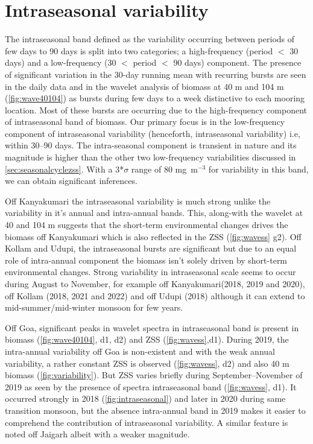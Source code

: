 \documentclass{article}
\begin{document}
	\section{Intraseasonal variability}
	\label{sec:intsnvar}
	The intraseasonal band defined as the variability occurring between periods of few days to 90 days is split into two categories; a high-frequency (period $<$ 30 days) and a low-frequency (30 $<$ period $<$ 90 days) component. The presence of significant variation in the 30-day running mean with recurring bursts are seen in the daily data and in the  wavelet analysis of biomass at 40 m and 104 m (\cref{fig:wave40104}) as bursts during few days to a week distinctive to each mooring location. Most of these bursts are occurring due to the high-frequency component of intraseasonal band of biomass. Our primary focus is in the low-frequency component of intraseasonal variability (henceforth, intraseasonal variability) i.e, within 30--90 days. The intra-seasonal component is transient in nature and its magnitude is higher than the other two low-frequency variabilities discussed in \autoref{sec:seasonalcyclezss}. With a 3*$\sigma$ range of 80 mg~m$^{-3}$ for variability in this band, we can obtain significant inferences. 
	
	Off Kanyakumari the intraseasonal variability is much strong unlike the variability in it's annual and intra-annual bands. This, along-with the wavelet at 40 and 104 m suggests that the short-term environmental changes drives the biomass off Kanyakumari which is also reflected in the ZSS (\cref{fig:wavess} g2). Off Kollam and Udupi, the intraseasonal bursts are significant but due to an equal role of intra-annual component the biomass isn't solely driven by short-term environmental changes. Strong variability in intraseasonal scale seems to occur during August to November, for example off Kanyakumari(2018, 2019 and 2020), off Kollam (2018, 2021 and 2022) and off Udupi (2018) although it can extend to mid-summer/mid-winter monsoon for few years.
	
	Off Goa, significant peaks in wavelet spectra in intraseasonal band is present in biomass (\cref{fig:wave40104}, d1, d2) and ZSS (\cref{fig:wavess},d1). During 2019, the intra-annual variability off Goa is non-existent and with the weak annual variability, a rather constant ZSS is observed (\cref{fig:wavess}, d2) and also 40 m biomass (\cref{fig:variability}). But ZSS varies briefly during September--November of 2019 as seen by the presence of spectra intraseasonal band (\cref{fig:wavess}, d1). It occurred strongly in 2018 (\cref{fig:intraseasonal}) and later in 2020 during same transition monsoon, but the absence intra-annual band in 2019 makes it easier to comprehend the contribution of intraseasonal variability. A similar feature is noted off Jaigarh albeit with a weaker magnitude.
	
\end{document}

